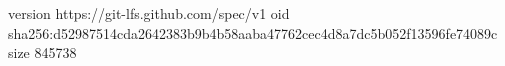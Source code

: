 version https://git-lfs.github.com/spec/v1
oid sha256:d52987514cda2642383b9b4b58aaba47762cec4d8a7dc5b052f13596fe74089c
size 845738
